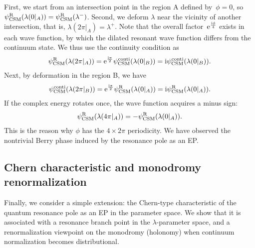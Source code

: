 First, we start from an intersection point in the region A defined by~$\phi=0$, so $\psi^{\mathrm{R}}_{\mathrm{CSM}}(\lambda(0|_A))=\psi^{\mathrm{R}}_{\mathrm{CSM}}(\lambda^{-})$.
Second, we deform $\lambda$ near the vicinity of another intersection, that is, $\lambda(2\pi|_A)=\lambda^{+}$. Note that the overall factor~$\mathrm{e}^{\frac{\mathrm{i} \phi}{4}}$ exists in each wave function, by which the dilated resonant wave function differs from the continuum state. We thus use the continuity condition as
\begin{align}
    \psi^{\mathrm{R}}_{\mathrm{CSM}}(\lambda(2\pi|_A))=\mathrm{e}^{\frac{\mathrm{i} \pi}{2}}\psi^{\mathrm{conti}}_{\mathrm{CSM}}(\lambda(0|_B))=\mathrm{i} \psi^{\mathrm{conti}}_{\mathrm{CSM}}(\lambda(0|_B)) .
\end{align}
Next, by deformation in the region B, we have
\begin{align}
    \psi^{\mathrm{conti}}_{\mathrm{CSM}}(\lambda(2\pi|_B))=\mathrm{e}^{\frac{\mathrm{i} \pi}{2}}\psi^{\mathrm{R}}_{\mathrm{CSM}}(\lambda(0|_A))=\mathrm{i} \psi^{\mathrm{R}}_{\mathrm{CSM}}(\lambda(0|_A)) .
\end{align}
If the complex energy rotates once, the wave function acquires a minus sign:
\begin{align}
    \psi^{\mathrm{R}}_{\mathrm{CSM}}(\lambda(4\pi|_A))
    = - \psi^{\mathrm{R}}_{\mathrm{CSM}}(\lambda(0|_A)) .
\end{align}
This is the reason why $\phi$ has the $4\times2\pi$ periodicity.
We have observed the nontrivial Berry phase induced by the resonance pole as an EP.
\subsection{Chern characteristic and monodromy renormalization}
Finally, we consider a simple extension: the Chern-type characteristic of the quantum resonance pole as an EP in the parameter space.
We show that it is associated with a resonance branch point in the $\lambda$-parameter space, and a renormalization viewpoint on the monodromy (holonomy) when continuum normalization becomes distributional.
